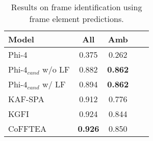 \begin{table}
    \centering
    \begin{tabularx}{\linewidth}{Xcccc}
        \hline
        \textbf{Model} & \textbf{All} & \textbf{Amb} \\ 
        \hline
        Phi-4                           & 0.375 & 0.262 \\ %
        $\text{Phi-4}_{cand}$ w/o LF    & 0.882 & \textbf{0.862} \\ %
        $\text{Phi-4}_{cand}$ w/ LF     & 0.894 & \textbf{0.862} \\ %
        \hline
        KAF-SPA             & 0.912 & 0.776 \\
        KGFI                & 0.924 & 0.844 \\
        CoFFTEA             & \textbf{0.926} & 0.850 \\
        \hline
    \end{tabularx}
    \caption{Results on frame identification using frame element predictions.}
    \label{tab:candidate_frame}
\end{table}